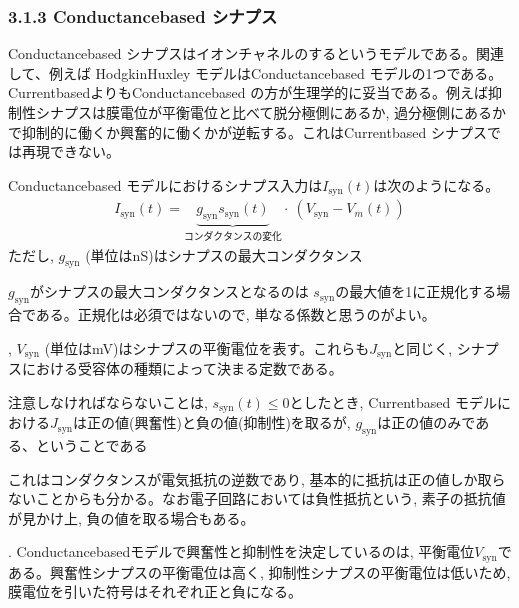 \documentclass[letterpaper,10pt,english]{sphinxmanual}
\begin{document}
\subsubsection{3.1.3 Conductance\sphinxhyphen{}based シナプス}
\label{\detokenize{3-2_current-conductance-synapse:conductance-based}}
Conductance\sphinxhyphen{}based シナプスはイオンチャネルのするというモデルである。関連して、例えば Hodgkin\sphinxhyphen{}Huxley モデルはConductance\sphinxhyphen{}based モデルの1つである。Current\sphinxhyphen{}basedよりもConductance\sphinxhyphen{}based の方が生理学的に妥当である。例えば抑制性シナプスは膜電位が平衡電位と比べて脱分極側にあるか, 過分極側にあるかで抑制的に働くか興奮的に働くかが逆転する。これはCurrent\sphinxhyphen{}based シナプスでは再現できない。

Conductance\sphinxhyphen{}based モデルにおけるシナプス入力は\(I_{\text{syn}}(t)\)は次のようになる。
\begin{equation*}
\begin{split}
\begin{equation}
I_{\text{syn}}(t)=\underbrace{g_{\text{syn}}s_{\text{syn}}(t)}_{コンダクタンスの変化}\cdot\ \left(V_{\text{syn}}-V_{m}(t)\right)    
\end{equation}
\end{split}
\end{equation*}
ただし, \(g_{\text{syn}}\) (単位はnS)はシナプスの最大コンダクタンス%
\begin{footnote}[3]\sphinxAtStartFootnote
\(g_{\text{syn}}\)がシナプスの最大コンダクタンスとなるのは \(s_{\text{syn}}\)の最大値を1に正規化する場合である。正規化は必須ではないので, 単なる係数と思うのがよい。
%
\end{footnote}, \(V_{\text{syn}}\) (単位はmV)はシナプスの平衡電位を表す。これらも\(J_{\text{syn}}\)と同じく, シナプスにおける受容体の種類によって決まる定数である。

注意しなければならないことは, \(s_{\text{syn}}(t)\leq 0\)としたとき, Current\sphinxhyphen{}based モデルにおける\(J_{\text{syn}}\)は正の値(興奮性)と負の値(抑制性)を取るが, \(g_{\text{syn}}\)は正の値のみである、ということである %
\begin{footnote}[4]\sphinxAtStartFootnote
これはコンダクタンスが電気抵抗の逆数であり, 基本的に抵抗は正の値しか取らないことからも分かる。なお電子回路においては負性抵抗という,  素子の抵抗値が見かけ上, 負の値を取る場合もある。
%
\end{footnote}. Conductance\sphinxhyphen{}basedモデルで興奮性と抑制性を決定しているのは, 平衡電位\(V_{\text{syn}}\)である。興奮性シナプスの平衡電位は高く, 抑制性シナプスの平衡電位は低いため, 膜電位を引いた符号はそれぞれ正と負になる。
\end{document}
